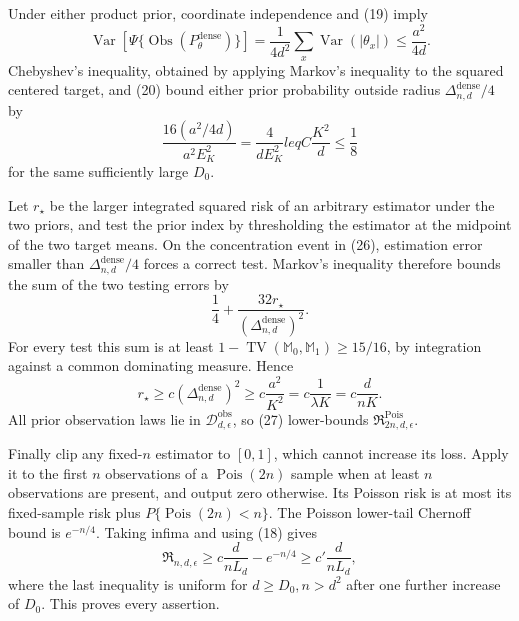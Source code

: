 Under either product prior, coordinate independence and (19) imply
\[
 \operatorname{Var}[\Psi\{\operatorname{Obs}(P_\theta^{\mathrm{dense}})\}]
 =\frac1{4d^2}\sum_x\operatorname{Var}(|\theta_x|)
 \leq\frac{a^2}{4d}.                                                 \tag{25}
\]
Chebyshev's inequality, obtained by applying Markov's inequality to the squared centered target, and (20) bound either prior probability outside radius \(\Delta_{n,d}^{\mathrm{dense}}/4\) by
\[
 \frac{16(a^2/4d)}{a^2E_K^2}=\frac4{dE_K^2}leq C\frac{K^2}{d}\leq\frac18 \tag{26}
\]
for the same sufficiently large \(D_0\).

Let \(r_\star\) be the larger integrated squared risk of an arbitrary estimator under the two priors, and test the prior index by thresholding the estimator at the midpoint of the two target means.  On the concentration event in (26), estimation error smaller than \(\Delta_{n,d}^{\mathrm{dense}}/4\) forces a correct test.  Markov's inequality therefore bounds the sum of the two testing errors by
\[
 \frac14+\frac{32r_\star}{(\Delta_{n,d}^{\mathrm{dense}})^2}.
\]
For every test this sum is at least \(1-\operatorname{TV}(\mathbb M_0,\mathbb M_1)\geq15/16\), by integration against a common dominating measure.  Hence
\[
 r_\star\geq c(\Delta_{n,d}^{\mathrm{dense}})^2
 \geq c\frac{a^2}{K^2}=c\frac1{\lambda K}=c\frac d{nK}.           \tag{27}
\]
All prior observation laws lie in \(\mathcal D_{d,\epsilon}^{\mathrm{obs}}\), so (27) lower-bounds \(\mathfrak R^{\mathrm{Pois}}_{2n,d,\epsilon}\).

Finally clip any fixed-\(n\) estimator to \([0,1]\), which cannot increase its loss.  Apply it to the first \(n\) observations of a \(\operatorname{Pois}(2n)\) sample when at least \(n\) observations are present, and output zero otherwise.  Its Poisson risk is at most its fixed-sample risk plus \(P\{\operatorname{Pois}(2n)<n\}\).  The Poisson lower-tail Chernoff bound is \(e^{-n/4}\).  Taking infima and using (18) gives
\[
 \mathfrak R_{n,d,\epsilon}\geq c\frac d{nL_d}-e^{-n/4}
 \geq c'\frac d{nL_d},                                               \tag{28}
\]
where the last inequality is uniform for \(d\geq D_0,n>d^2\) after one further increase of \(D_0\).  This proves every assertion.